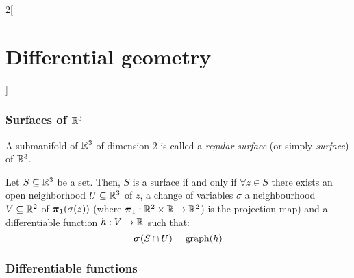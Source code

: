 \documentclass[../../../main.tex]{subfiles}
\begin{document}
\begin{multicols}{2}[\section{Differential geometry}]
  \subsubsection{Surfaces of \texorpdfstring{$\mathbb{R}^3$}{R3}}
  \begin{definition}
    A submanifold of $\mathbb{R}^3$ of dimension 2 is called a \emph{regular surface} (or simply \emph{surface}) of $\mathbb{R}^3$.
  \end{definition}
  \begin{proposition}
    Let $S\subseteq\mathbb{R}^3$ be a set. Then, $S$ is a surface if and only if $\forall z\in S$ there exists an open neighborhood $U\subseteq \mathbb{R}^3$ of $z$, a change of variables $\sigma$ a neighbourhood $V\subseteq \mathbb{R}^2$ of $\boldsymbol{\mathrm{\pi}}_1(\sigma(z))$ (where $\boldsymbol{\mathrm{\pi}}_1:\mathbb{R}^2\times \mathbb{R}\rightarrow\mathbb{R}^2$) is the projection map) and a differentiable function $h:V\rightarrow \mathbb{R}$ such that: $$\boldsymbol{\mathrm{\sigma}}(S\cap U)=\operatorname{graph}(h)$$
  \end{proposition}
  \subsubsection{Differentiable functions}
\end{multicols}
\end{document}
